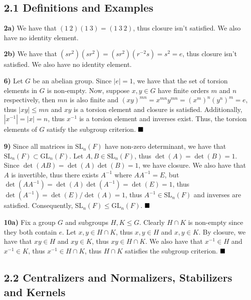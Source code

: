 \documentclass[12pt]{article}
\newcommand{\vertb}[1]{\left\vert#1\right\vert}
\newcommand{\done}{\ensuremath{\strut\hfill\blacksquare}}
\begin{document}
\pagestyle{fancy}

\setlength{\parindent}{0in}
\setlength{\parskip}{0.1in}

\subsection*{2.1 Definitions and Examples}

\textbf{2a)}
We have that \( (1\ 2)(1\ 3) = (1\ 3\ 2) \), thus closure isn't satisfied.
We also have no identity element.

\textbf{2b)}
We have that \( (sr^{2})(sr^{2}) = (sr^{2})(r^{-2}s) = s^2 = e \), thus closure
isn't satisfied.
We also have no identity element.

\textbf{6)}
Let \( G \) be an abelian group.
Since \( \vertb{e} = 1 \), we have that the set of torsion elements in \( G \)
is non-empty.
Now, suppose \( x, y \in G \) have finite orders \( m \) and \( n \)
respectively, then \( mn \) is also finite and
\( (xy)^{mn} = x^{mn}y^{mn} = (x^m)^n(y^n)^m = e \), thus
\( \vertb{xy} \leq mn \) and \( xy \) is a torsion element and closure is
satisfied.
Additionally, \( \vertb{x^{-1}} = \vertb{x} = n \), thus \( x^{-1} \) is a
torsion element and inverses exist.
Thus, the torsion elements of \( G \) satisfy the subgroup criterion.
\done

\textbf{9)} Since all matrices in \( \text{SL}_n(F) \) have non-zero
determinant, we have that \( \text{SL}_n(F) \subset \text{GL}_n(F) \).
Let \( A, B \in \text{SL}_n(F) \), thus
\( \det(A) = \det(B) = 1 \).
Since \( \det(AB) = \det(A)\det(B) = 1 \), we have closure.
We also have that \( A \) is invertible, thus there exists \( A^{-1} \) where
\( AA^{-1} = E \), but \( \det(AA^{-1}) = \det(A)\det(A^{-1}) = \det(E) = 1 \),
thus \( \det(A^{-1}) = \det(E) / \det(A) = 1 \), thus
\( A^{-1} \in \text{SL}_n(F) \) and inverses are satisfied.
Consequently, \( \text{SL}_n(F) \leq \text{GL}_n(F) \).
\done

\textbf{10a)} Fix a group \( G \) and subgroups \( H, K \leq G \).
Clearly \( H \cap K \) is non-empty since they both contain \( e \).
Let \( x, y \in H \cap K \), thus \( x, y \in H \) and \( x, y \in K \).
By closure, we have that \( xy \in H \) and \( xy \in K \), thus
\( xy \in H \cap K \).
We also have that \( x^{-1} \in H \) and \( x^{-1} \in K \), thus
\( x^{-1} \in H \cap K \), thus \( H \cap K \) satisfies the subgroup
criterion.
\done

\subsection*{2.2 Centralizers and Normalizers, Stabilizers and Kernels}
\end{document}
